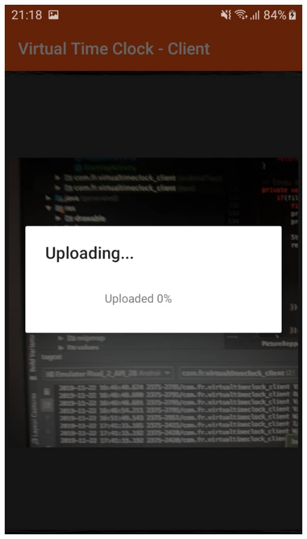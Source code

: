 \documentclass{article}
\begin{document}
\begin{center}
  	\includegraphics[scale=0.15]{photoUpdateAnd.jpg}

\end{center}
\end{document}
